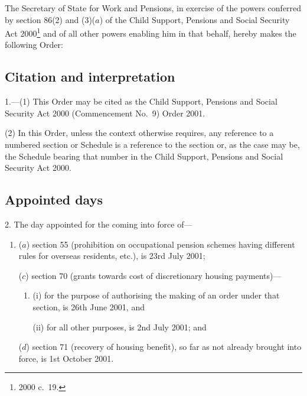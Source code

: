 \documentclass[12pt,a4paper]{article}
\title{\regstitle}
\author{S.I.\ 2001 No.\ 2295 (C.\ 76)}
\date{Made
22nd June 2001\\
}
\begin{document}
\maketitle

\noindent
The Secretary of State for Work and Pensions, in exercise of the powers conferred by section 86(2) and (3)($a$)  of the Child Support, Pensions and Social Security Act 2000\footnote{2000 c.\ 19.} and of all other powers enabling him in that behalf, hereby makes the following Order: 

{\sloppy

\tableofcontents

}

\bigskip

\setcounter{secnumdepth}{-2}

\subsection[1. Citation and interpretation]{Citation and interpretation}

1.---(1)  This Order may be cited as the Child Support, Pensions and Social Security Act 2000 (Commencement No.\ 9) Order 2001.

(2) In this Order, unless the context otherwise requires, any reference to a numbered section or Schedule is a reference to the section or, as the case may be, the Schedule bearing that number in the Child Support, Pensions and Social Security Act 2000.

\subsection[2. Appointed days]{Appointed days}

2.  The day appointed for the coming into force of—
\begin{enumerate}\item[]
($a$) section 55 (prohibition on occupational pension schemes having different rules for overseas residents, etc.), is 23rd July 2001;


($c$) section 70 (grants towards cost of discretionary housing payments)—
\begin{enumerate}\item[]
(i) for the purpose of authorising the making of an order under that section, is 26th June 2001, and

(ii) for all other purposes, is 2nd July 2001; and
\end{enumerate}

($d$) section 71 (recovery of housing benefit), so far as not already brought into force, is 1st October 2001.
\end{enumerate}
\end{document}
